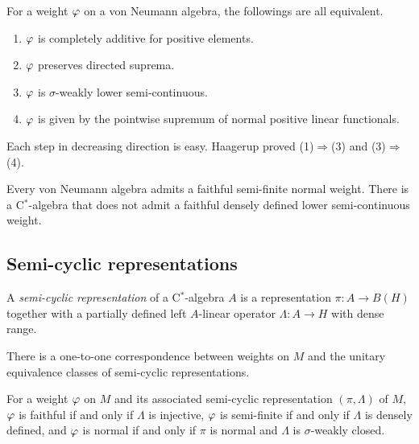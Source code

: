 \documentclass{../../../../small}
\begin{document}
\begin{theorem*}[Haagerup, 1975]
For a weight $\varphi$ on a von Neumann algebra, the followings are all equivalent.
\begin{enumerate}[(1)]
\item $\varphi$ is completely additive for positive elements.
\item $\varphi$ preserves directed suprema.
\item $\varphi$ is $\sigma$-weakly lower semi-continuous.
\item $\varphi$ is given by the pointwise supremum of normal positive linear functionals.
\end{enumerate}
\end{theorem*}

\begin{remark*}
Each step in decreasing direction is easy.
Haagerup proved (1)$\Rightarrow$(3) and (3)$\Rightarrow$(4).
\end{remark*}

\begin{remark*}
Every von Neumann algebra admits a faithful semi-finite normal weight.
There is a C$^*$-algebra that does not admit a faithful densely defined lower semi-continuous weight.
\end{remark*}






\subsection{Semi-cyclic representations}


\begin{definition*}
A \emph{semi-cyclic representation} of a C$^*$-algebra $A$ is a representation $\pi:A\to B(H)$ together with a partially defined left $A$-linear operator $\Lambda:A\to H$ with dense range.
\end{definition*}
\begin{proposition*}
There is a one-to-one correspondence between weights on $M$ and the unitary equivalence classes of semi-cyclic representations.
\end{proposition*}
\begin{proposition*}
For a weight $\varphi$ on $M$ and its associated semi-cyclic representation $(\pi,\Lambda)$ of $M$, $\varphi$ is faithful if and only if $\Lambda$ is injective, $\varphi$ is semi-finite if and only if $\Lambda$ is densely defined, and $\varphi$ is normal if and only if $\pi$ is normal and $\Lambda$ is $\sigma$-weakly closed.
\end{proposition*}
\end{document}
